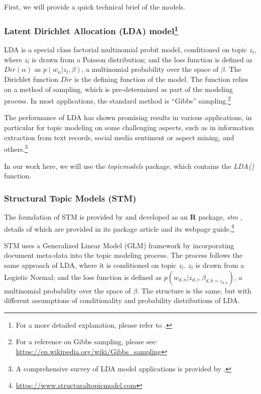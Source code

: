 \documentclass[
]{article}
\begin{document}
First, we will provide a quick technical brief of the models.

\hypertarget{latent-dirichlet-allocation-lda-model}{%
\subsubsection[Latent Dirichlet Allocation (LDA) model]{\texorpdfstring{Latent Dirichlet Allocation (LDA) model\footnote{For a more detailed explanation, please refer to \citep{blei2003}.}}{Latent Dirichlet Allocation (LDA) model}}\label{latent-dirichlet-allocation-lda-model}}

LDA is a special class factorial multinomial probit model, conditioned on topic \(z_l\), where \(z_l\) is drawn from a Poisson distribution; and the loss function is defined as \(Dir(\alpha)\) as \(p(w_n|z_l,\beta)\), a multinomial probability over the space of \(\beta\). The Dirichlet function \(Dir\) is the defining function of the model. The function relies on a method of sampling, which is pre-determined as part of the modeling process. In most applications, the standard method is ``Gibbs'' sampling.\footnote{For a reference on Gibbs sampling, please see: \url{https://en.wikipedia.org/wiki/Gibbs_sampling}}

The performance of LDA has shown promising results in various applications, in particular for topic modeling on some challenging aspects, such as in information extraction from text records, social media sentiment or aspect mining, and others.\footnote{A comprehensive survey of LDA model applications is provided by \citep{jelodar2019}.}

In our work here, we will use the \emph{topicmodels} package, which contains the \emph{LDA()} function.

\hypertarget{structural-topic-models-stm}{%
\subsubsection{Structural Topic Models (STM)}\label{structural-topic-models-stm}}

The foundation of STM is provided by \citep{roberts2014} and developed as an \textbf{R} package, \emph{stm} \citep{stm}, details of which are provided in its package article \citep{roberts2019} and its webpage guide.\footnote{\url{https://www.structuraltopicmodel.com}}

STM uses a Generalized Linear Model (GLM) framework by incorporating document meta-data into the topic modeling process. The process follows the same approach of LDA, where it is conditioned on topic \(z_l\). \(z_l\) is drawn from a Logistic Normal; and the loss function is defined as \(p(w_{d,n}|z_{d,l},\beta_{d,k=z_{d,n}})\), a multinomial probability over the space of \(\beta\). The structure is the same, but with different assumptions of conditionality and probability distributions of LDA.
\end{document}
